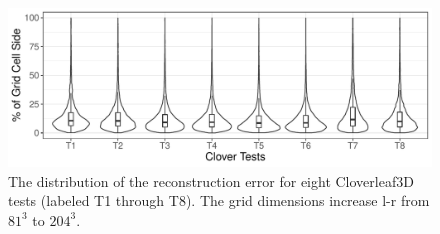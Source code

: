 \begin{figure}[!t]
\centering
\includegraphics[width=\linewidth]{Images/Clover_Tests_1_8.pdf}
\caption{The distribution of the reconstruction error for eight Cloverleaf3D tests (labeled T1 through T8). The grid dimensions increase l-r from $81^{3}$ to $204^{3}$.}
\label{fig:clover_plot}
\end{figure}
